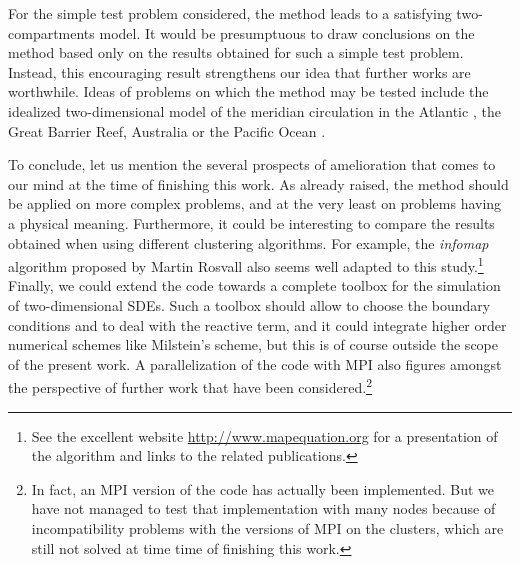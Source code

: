 For the simple test problem considered, the method leads to a satisfying two-compartments model. It would be presumptuous to draw conclusions on the method based only on the results obtained for such a simple test problem. Instead, this encouraging result strengthens our idea that further works are worthwhile. Ideas of problems on which the method may be tested include the idealized two-dimensional model of the meridian circulation in the Atlantic \cite{deleersnijder2006overturner}, the Great Barrier Reef, Australia \cite{thomas2014numerical} or the Pacific Ocean \cite{shah2017tracing}.

To conclude, let us mention the several prospects of amelioration that comes to our mind at the time of finishing this work. As already raised, the method should be applied on more complex problems, and at the very least on problems having a physical meaning. Furthermore, it could be interesting to compare the results obtained when using different clustering algorithms. For example, the \textit{infomap} algorithm proposed by Martin Rosvall also seems well adapted to this study.\footnote{See the excellent website \url{http://www.mapequation.org} for a presentation of the algorithm and links to the related publications.} Finally, we could extend the \Cpp code towards a complete toolbox for the simulation of two-dimensional SDEs. Such a toolbox should allow to choose the boundary conditions and to deal with the reactive term, and it could integrate higher order numerical schemes like Milstein's scheme, but this is of course outside the scope of the present work. A parallelization of the code with MPI also figures amongst the perspective of further work that have been considered.\footnote{In fact, an MPI version of the code has actually been implemented. But we have not managed to test that implementation with many nodes because of incompatibility problems with the versions of MPI on the clusters, which are still not solved at time time of finishing this work.}

